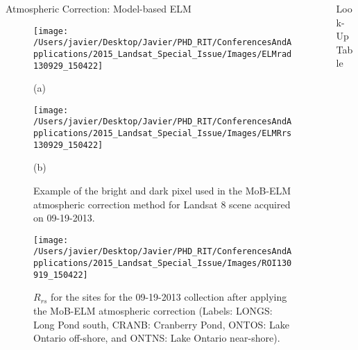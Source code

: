 \documentclass{beamer}
\begin{document}
\begin{frame}{}
\begin{columns}[t]
\begin{column}{.3\linewidth}
\begin{block}{Atmospheric Correction: Model-based ELM}
\begin{figure}[htb]
  \begin{minipage}[c]{0.40\linewidth}
    \centering
      \texttt{[image: /Users/javier/Desktop/Javier/PHD\_RIT/ConferencesAndApplications/2015\_Landsat\_Special\_Issue/Images/ELMrad130929\_150422]}\\
    \centerline{(a)}\medskip
  \end{minipage}
  \hspace{1cm}
  \begin{minipage}[d]{0.40\linewidth}
    \centering
      \texttt{[image: /Users/javier/Desktop/Javier/PHD\_RIT/ConferencesAndApplications/2015\_Landsat\_Special\_Issue/Images/ELMRrs130929\_150422]}\\
    \centerline{(b)}\medskip
  \end{minipage}
  \caption{Example of the bright and dark pixel used in the MoB-ELM atmospheric correction method for Landsat 8 scene acquired on 09-19-2013.\label{fig:MOBELMpxls} } 
\end{figure}

\begin{figure}[htbp!]
  \centering
  \texttt{[image: /Users/javier/Desktop/Javier/PHD\_RIT/ConferencesAndApplications/2015\_Landsat\_Special\_Issue/Images/ROI130919\_150422]}
  \caption{$R_{rs}$ for the sites for the 09-19-2013 collection after applying the MoB-ELM atmospheric correction (Labels: LONGS: Long Pond south, CRANB: Cranberry Pond, ONTOS: Lake Ontario off-shore, and ONTNS: Lake Ontario near-shore).\label{fig:RrsROIs130919} } 
\end{figure}
\vspace{-.2cm}
\end{block}


\end{column}
 \begin{column}{.3\linewidth}
\begin{block}{Look-Up Table}


\end{block}
\end{column}
\end{columns}
\end{frame}
\end{document}
